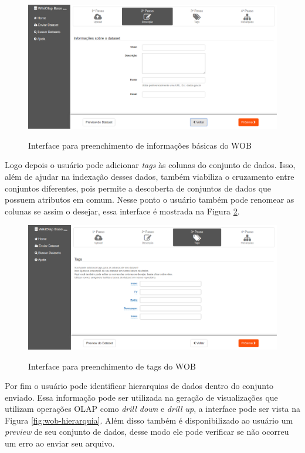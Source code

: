 \begin{figure}[!htb]
    \centering
    \caption{Interface para preenchimento de informações básicas do WOB}
    \includegraphics[width=1\textwidth]{./04-figuras/wob-info}
    \label{fig:wob-info}
\end{figure}

Logo depois o usuário pode adicionar \textit{tags} às colunas do conjunto de dados. Isso, 
além de ajudar na indexação desses dados, também viabiliza o cruzamento entre conjuntos 
diferentes, pois permite a descoberta de conjuntos de dados que possuem atributos em comum. 
Nesse ponto o usuário também pode renomear as colunas se assim o desejar, essa interface é 
mostrada na Figura \ref{fig:wob-tags}. 

\begin{figure}[!htb]
    \centering
    \caption{Interface para preenchimento de tags do WOB}
    \includegraphics[width=1\textwidth]{./04-figuras/wob-tags}
    \label{fig:wob-tags}
\end{figure}

Por fim o usuário pode identificar hierarquias de dados dentro do conjunto enviado. Essa 
informação pode ser utilizada na geração de visualizações que utilizam operações OLAP como 
\textit{drill down} e \textit{drill up}, a interface pode ser vista na Figura \ref{fig:wob-hierarquia}. 
Além disso também é disponibilizado ao usuário um \textit{preview} de seu conjunto de dados, 
desse modo ele pode verificar se não ocorreu um erro ao enviar seu arquivo.\newline


